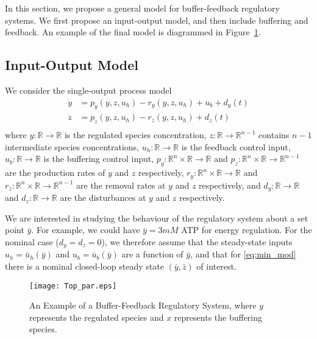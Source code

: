 \documentclass[letterpaper, 10 pt,  conference]{ieeeconf}  %
\newcommand{\R}{{\mathbb R}}
\begin{document}
In this section, we propose a general model for buffer-feedback regulatory systems. We first propose an input-output model, and then include buffering and feedback. An example of the final model is diagrammed in Figure~\ref{fig:top}. 

\subsection{Input-Output Model}

We consider the single-output process model
\begin{equation}\label{eq:min_mod}
\begin{aligned}
	\dot{y}&=p_y(y,z,u_h)-r_y(y,z,u_h)+u_b+d_y(t)\\
	\dot{z}&=p_z(y,z,u_h)-r_z(y,z,u_h)+d_z(t)\\
\end{aligned}
\end{equation}
where $y:\R\to\R$ is the regulated species concentration, $z:\R\to\R^{n-1}$ contains $n-1$ intermediate species concentrations, $u_h:\R\to\R$ is the feedback control input, $u_b:\R\to\R$ is the buffering control input,  $p_y:\R^n\times\R\to\R$ and $p_z:\R^n\times\R\to\R^{n-1}$ are the production rates of $y$ and $z$ respectively, $r_y:\R^n\times\R\to\R$ and $r_z:\R^n\times\R\to\R^{n-1}$ are the removal rates at $y$ and $z$ respectively, and $d_y:\R\to\R$ and $d_z:\R\to\R$ are the disturbances at $y$ and $z$ respectively.

We are interested in studying the behaviour of the regulatory system about a set point $\bar{y}$. For example, we could have $\bar{y}=3mM$ ATP for energy regulation. For the nominal case ($d_y=d_z=0$), we therefore assume that the steady-state inputs $u_h=\bar{u}_h(\bar{y})$ and $u_b=\bar{u}_b(\bar{y})$ are a function of $\bar{y}$, and that for \eqref{eq:min_mod} there is a nominal closed-loop steady state $(\bar{y},\bar{z})$ of interest. 

\begin{figure}
\centering
    \texttt{[image: Top\_par.eps]}
\caption{An Example of a Buffer-Feedback Regulatory System, where $y$ represents the regulated species and $x$ represents the buffering species.}
\label{fig:top}
\end{figure}
\end{document}
